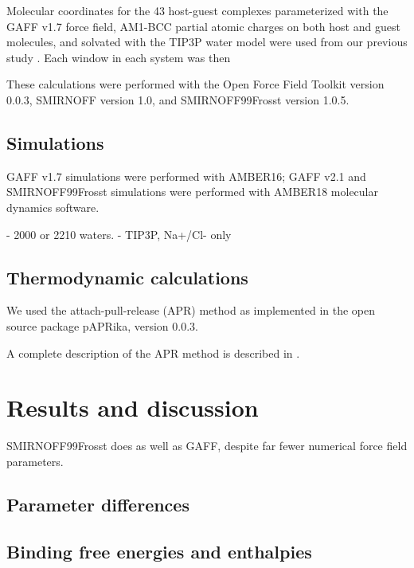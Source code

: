 \documentclass[9pt,lineno]{elife}
\begin{document}
Molecular coordinates for the 43 host-guest complexes parameterized with the GAFF v1.7 force field, AM1-BCC partial atomic charges on both host and guest molecules, and solvated with the TIP3P water model were used from our previous study \cite{henriksen_evaluating_2017}.
Each window in each system was then 

These calculations were performed with the Open Force Field Toolkit version 0.0.3, SMIRNOFF version 1.0, and SMIRNOFF99Frosst version 1.0.5.

\subsection{Simulations}
GAFF v1.7 simulations were performed with AMBER16; GAFF v2.1 and SMIRNOFF99Frosst simulations were performed with AMBER18 molecular dynamics software.

- 2000 or 2210 waters.
- TIP3P, Na+/Cl- only




\subsection{Thermodynamic calculations}
We used the attach-pull-release (APR) method as implemented in the open source package pAPRika, version 0.0.3.

A complete description of the APR method is described in \cite{henriksen_computational_2015}.

\section{Results and discussion}
SMIRNOFF99Frosst does as well as GAFF, despite far fewer numerical force field parameters.

\subsection{Parameter differences}

\subsection{Binding free energies and enthalpies}
\end{document}
